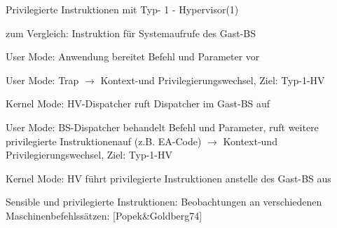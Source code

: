 \documentclass[a4paper]{article}
\begin{document}
\begin{multicols}{3}

    Privilegierte Instruktionen mit Typ- 1 - Hypervisor(1)

    \begin{itemize*}
        \item
        zum Vergleich: Instruktion für Systemaufrufe des Gast-BS
    \end{itemize*}

    \begin{enumerate*}
        \item
        User Mode: Anwendung bereitet Befehl und Parameter vor
        \item
        User Mode: Trap $\rightarrow$ Kontext-und
        Privilegierungswechsel, Ziel: Typ-1-HV
        \item
        Kernel Mode: HV-Dispatcher ruft Dispatcher im Gast-BS auf
        \item
        User Mode: BS-Dispatcher behandelt Befehl und Parameter, ruft weitere
        privilegierte Instruktionenauf (z.B. EA-Code)
        $\rightarrow$ Kontext-und Privilegierungswechsel,
        Ziel: Typ-1-HV
        \item
        Kernel Mode: HV führt privilegierte Instruktionen anstelle des Gast-BS
        aus
    \end{enumerate*}



    Sensible und privilegierte Instruktionen: Beobachtungen an verschiedenen
    Maschinenbefehlssätzen: [Popek\&Goldberg74]


\end{multicols}
\end{document}
